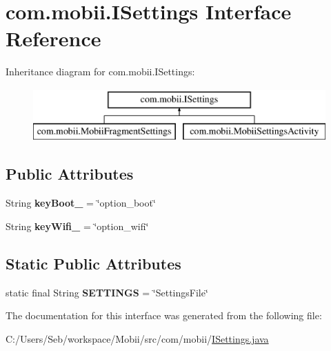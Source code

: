 \hypertarget{interfacecom_1_1mobii_1_1_i_settings}{\section{com.\-mobii.\-I\-Settings Interface Reference}
\label{interfacecom_1_1mobii_1_1_i_settings}
}
Inheritance diagram for com.\-mobii.\-I\-Settings\-:\begin{figure}[H]
\begin{center}
\leavevmode
\includegraphics[height=2.000000cm]{interfacecom_1_1mobii_1_1_i_settings}
\end{center}
\end{figure}
\subsection*{Public Attributes}
\begin{DoxyCompactItemize}
\item 
\hypertarget{interfacecom_1_1mobii_1_1_i_settings_a82e5d94528a022d82e7dcd6794a0366c}{String {\bfseries key\-Boot\-\_\-} = \char`\"{}option\-\_\-boot\char`\"{}}\label{interfacecom_1_1mobii_1_1_i_settings_a82e5d94528a022d82e7dcd6794a0366c}

\item 
\hypertarget{interfacecom_1_1mobii_1_1_i_settings_a50c67860ce00e6d8cd91f6528632f05d}{String {\bfseries key\-Wifi\-\_\-} = \char`\"{}option\-\_\-wifi\char`\"{}}\label{interfacecom_1_1mobii_1_1_i_settings_a50c67860ce00e6d8cd91f6528632f05d}

\end{DoxyCompactItemize}
\subsection*{Static Public Attributes}
\begin{DoxyCompactItemize}
\item 
\hypertarget{interfacecom_1_1mobii_1_1_i_settings_a1351f88e18d4dd1a28ac8cb3439e19d9}{static final String {\bfseries S\-E\-T\-T\-I\-N\-G\-S} = \char`\"{}Settings\-File\char`\"{}}\label{interfacecom_1_1mobii_1_1_i_settings_a1351f88e18d4dd1a28ac8cb3439e19d9}

\end{DoxyCompactItemize}


The documentation for this interface was generated from the following file\-:\begin{DoxyCompactItemize}
\item 
C\-:/\-Users/\-Seb/workspace/\-Mobii/src/com/mobii/\hyperlink{_i_settings_8java}{I\-Settings.\-java}\end{DoxyCompactItemize}

